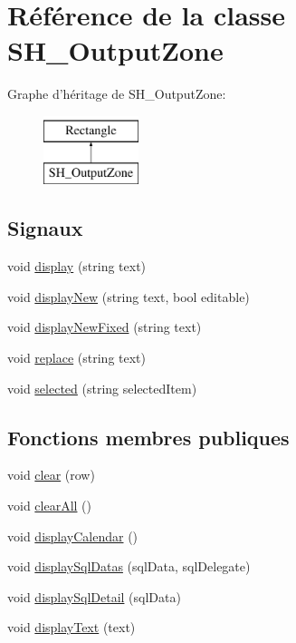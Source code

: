 \hypertarget{classSH__OutputZone}{\section{Référence de la classe S\-H\-\_\-\-Output\-Zone}
\label{classSH__OutputZone}
}
Graphe d'héritage de S\-H\-\_\-\-Output\-Zone\-:\begin{figure}[H]
\begin{center}
\leavevmode
\includegraphics[height=2.000000cm]{classSH__OutputZone}
\end{center}
\end{figure}
\subsection*{Signaux}
\begin{DoxyCompactItemize}
\item 
void \hyperlink{classSH__OutputZone_a137f08121743a873a4b803378564b831}{display} (string text)
\item 
void \hyperlink{classSH__OutputZone_ae5a2247f1c3223e5a73de52fdbdb821b}{display\-New} (string text, bool editable)
\item 
void \hyperlink{classSH__OutputZone_a899a18d02081f15ec88699652926d1b2}{display\-New\-Fixed} (string text)
\item 
void \hyperlink{classSH__OutputZone_af5abdd0bd587e4df3ed9278192978da5}{replace} (string text)
\item 
void \hyperlink{classSH__OutputZone_a41c89f3ac170cc1fa3f2946c155da958}{selected} (string selected\-Item)
\end{DoxyCompactItemize}
\subsection*{Fonctions membres publiques}
\begin{DoxyCompactItemize}
\item 
void \hyperlink{classSH__OutputZone_a5e060d86ebcea9f4dd4acfd203d324de}{clear} (row)
\item 
void \hyperlink{classSH__OutputZone_a90e3b3d2bdd58bef244d5a347ddcf74a}{clear\-All} ()
\item 
void \hyperlink{classSH__OutputZone_a3fb363c9732edb963b97a0af893378a7}{display\-Calendar} ()
\item 
void \hyperlink{classSH__OutputZone_ad898491cb4e3c7f27d1a020a12b0de83}{display\-Sql\-Datas} (sql\-Data, sql\-Delegate)
\item 
void \hyperlink{classSH__OutputZone_a5a785363482e4bd17c0f9cee4d29e2ee}{display\-Sql\-Detail} (sql\-Data)
\item 
void \hyperlink{classSH__OutputZone_a2643d4fe88a476c2296f9e7a44da6c62}{display\-Text} (text)
\end{DoxyCompactItemize}
